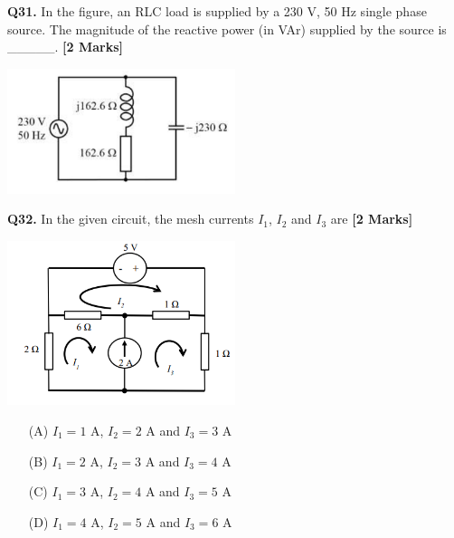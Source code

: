 \documentclass[11pt]{article}
\newcommand{\questionb}[2]{
    \noindent\textbf{Q#2.} #1 \hfill \textbf{[2 Marks]}
}
\begin{document}
\questionb{In the figure, an RLC load is supplied by a 230 V, 50 Hz single phase source. The magnitude of the reactive power (in VAr) supplied by the source is \_\_\_\_\_.}{31}
\begin{center}
\includegraphics[width=0.5\textwidth]{figures/31.png}
\end{center}
\vspace{0.5cm}

\questionb{In the given circuit, the mesh currents \(I_1\), \(I_2\) and \(I_3\) are}{32}
\begin{center}
\includegraphics[width=0.5\textwidth]{figures/32.png}
\end{center}
\begin{enumerate}
    \item[(A)] \(I_1 = 1\) A, \(I_2 = 2\) A and \(I_3 = 3\) A
    \item[(B)] \(I_1 = 2\) A, \(I_2 = 3\) A and \(I_3 = 4\) A
    \item[(C)] \(I_1 = 3\) A, \(I_2 = 4\) A and \(I_3 = 5\) A
    \item[(D)] \(I_1 = 4\) A, \(I_2 = 5\) A and \(I_3 = 6\) A
\end{enumerate}
\vspace{0.5cm}
\end{document}
